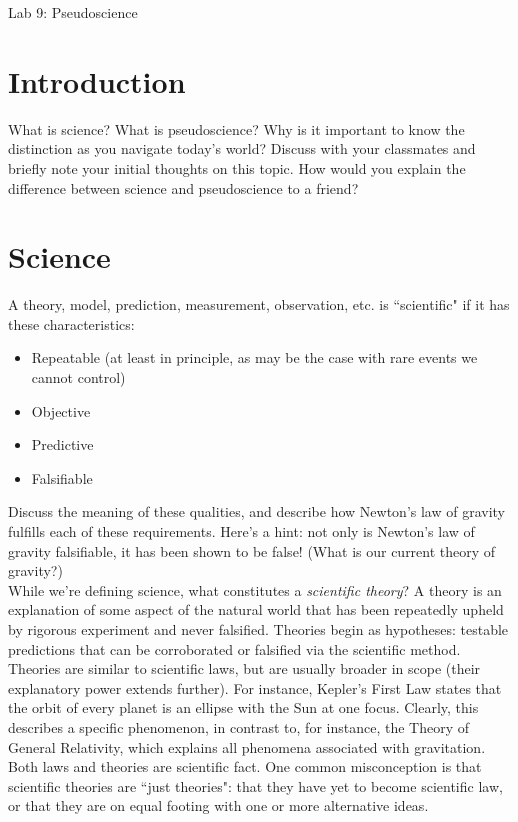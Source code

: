 \documentclass[12pt]{article}
\begin{document}
 \begin{center}
{\huge Lab 9: Pseudoscience}\\
\end{center} 

\section{Introduction}
What is science? What is pseudoscience? Why is it important to know the distinction as you navigate today's world? Discuss with your classmates and briefly note your initial thoughts on this topic. How would you explain the difference between science and pseudoscience to a friend?

\section{Science}
A theory, model, prediction, measurement, observation, etc. is ``scientific" if it has these characteristics:
\begin{itemize}
\item Repeatable (at least in principle, as may be the case with rare events we cannot control)
\item Objective
\item Predictive
\item Falsifiable
\end{itemize}

\noindent Discuss the meaning of these qualities, and describe how Newton's law of gravity fulfills each of these requirements. Here's a hint: not only is Newton's law of gravity falsifiable, it has been shown to be false! (What is our current theory of gravity?) \\

\noindent While we're defining science, what constitutes a \textit{scientific theory}? A theory is an explanation of some aspect of the natural world that has been repeatedly upheld by rigorous experiment and never falsified. Theories begin as hypotheses: testable predictions that can be corroborated or falsified via the scientific method. Theories are similar to scientific laws, but are usually broader in scope (their explanatory power extends further). For instance, Kepler's First Law states that the orbit of every planet is an ellipse with the Sun at one focus. Clearly, this describes a specific phenomenon, in contrast to, for instance, the Theory of General Relativity, which explains all phenomena associated with gravitation. Both laws and theories are scientific fact. One common misconception is that scientific theories are ``just theories": that they have yet to become scientific law, or that they are on equal footing with one or more alternative ideas. 
\end{document}
